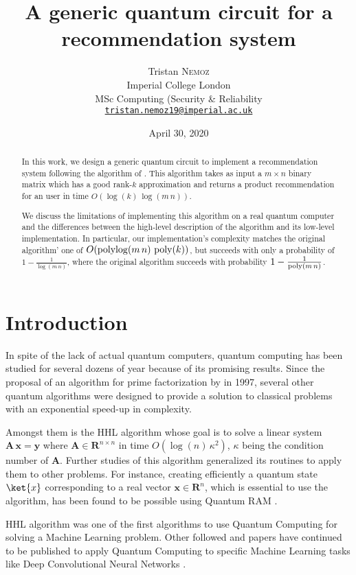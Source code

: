 \documentclass[11pt, a4paper]{article}
\date{April 30, 2020}
\author{Tristan \textsc{Nemoz}\\Imperial College London\\MSc Computing (Security \& Reliability\\\href{mailto:tristan.nemoz19@imperial.ac.uk}{\texttt{tristan.nemoz19@imperial.ac.uk}}}
\title{A generic quantum circuit for a recommendation system}
\begin{document}
	
	\maketitle
    \begin{abstract}
        In this work, we design a generic quantum circuit to implement a recommendation system following the algorithm of \citeauthor{QRS}. This algorithm takes as input a \(m\times n\) binary matrix which has a good rank-\(k\) approximation and returns a product recommendation for an user in time \(O(\log(k)\,\log(m\,n))\).
        
        We discuss the limitations of implementing this algorithm on a real quantum computer and the differences between the high-level description of the algorithm and its low-level implementation. In particular, our implementation's complexity matches the original algorithm' one of \(O(\operatorname{polylog}(m\,n)\,\operatorname{poly}(k))\), but succeeds with only a probability of \(1-\frac{1}{\log(m\,n)}\), where the original algorithm succeeds with probability \(1 - \frac{1}{\operatorname{poly}(m\,n)}\).
    \end{abstract}
    
    \section{Introduction}
        In spite of the lack of actual quantum computers, quantum computing has been studied for several dozens of year because of its promising results. Since the proposal of an algorithm for prime factorization \cite{Shor} by \citeauthor{Shor} in 1997, several other quantum algorithms were designed to provide a solution to classical problems with an exponential speed-up in complexity.
        
        Amongst them is the HHL algorithm \cite{HHL} whose goal is to solve a linear system \(\mathbf{A}\,\mathbf{x}=\mathbf{y}\) where \(\mathbf{A}\in\mathbf{R}^{n\times n}\) in time \(O\left(\log(n)\,\kappa^2\right)\), \(\kappa\) being the condition number of \(\mathbf{A}\). Further studies of this algorithm generalized its routines to apply them to other problems. For instance, creating efficiently a quantum state \(\ket{x}\) corresponding to a real vector \(\mathbf{x}\in\mathbf{R}^n\), which is essential to use the algorithm, has been found to be possible using Quantum RAM \cite{Prakash, QRAM, QRAMCircuit}.
        
        HHL algorithm was one of the first algorithms to use Quantum Computing for solving a Machine Learning problem. Other followed and papers have continued to be published to apply Quantum Computing to specific Machine Learning tasks like Deep Convolutional Neural Networks \cite{QCNN}.
        
\end{document}
